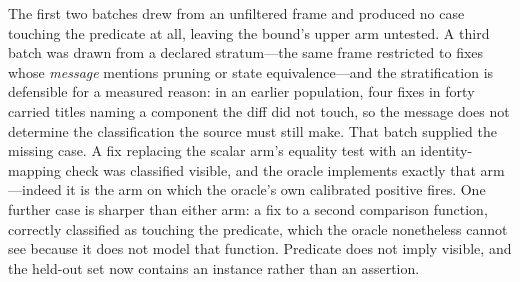 The first two batches drew from an unfiltered frame and produced no case touching
the predicate at all, leaving the bound's upper arm untested. A third batch was
drawn from a declared stratum---the same frame restricted to fixes whose
\emph{message} mentions pruning or state equivalence---and the stratification is
defensible for a measured reason: in an earlier population, four fixes in forty
carried titles naming a component the diff did not touch, so the message does not
determine the classification the source must still make. That batch supplied the
missing case. A fix replacing the scalar arm's equality test with an
identity-mapping check was classified visible, and the oracle implements exactly
that arm---indeed it is the arm on which the oracle's own calibrated positive
fires. One further case is sharper than either arm: a fix to a second comparison
function, correctly classified as touching the predicate, which the oracle
nonetheless cannot see because it does not model that function. Predicate does not
imply visible, and the held-out set now contains an instance rather than an
assertion.

